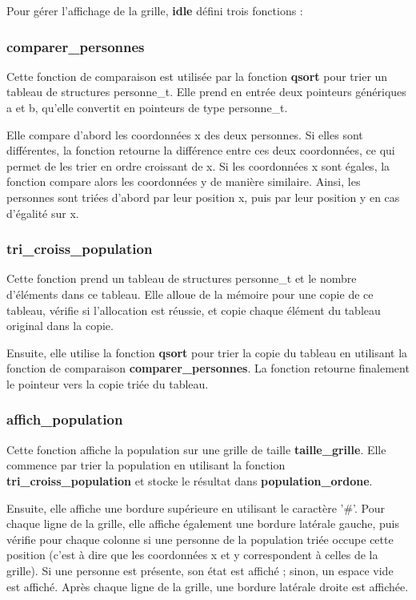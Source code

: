 \documentclass[12pt,french,titlepage]{article}
\begin{document}
Pour gérer l'affichage de la grille, \textbf{idle} défini trois fonctions :
\subsubsection*{comparer\_personnes}
Cette fonction de comparaison est utilisée par la fonction \textbf{qsort} pour trier un tableau de structures personne\_t. Elle prend en entrée deux pointeurs génériques a et b, qu'elle convertit en pointeurs de type personne\_t.

Elle compare d'abord les coordonnées x des deux personnes. Si elles sont différentes, la fonction retourne la différence entre ces deux coordonnées, ce qui permet de les trier en ordre croissant de x. Si les coordonnées x sont égales, la fonction compare alors les coordonnées y de manière similaire. Ainsi, les personnes sont triées d'abord par leur position x, puis par leur position y en cas d'égalité sur x.

\subsubsection*{tri\_croiss\_population}
Cette fonction prend un tableau de structures personne\_t et le nombre d'éléments dans ce tableau. Elle alloue de la mémoire pour une copie de ce tableau, vérifie si l'allocation est réussie, et copie chaque élément du tableau original dans la copie.

Ensuite, elle utilise la fonction \textbf{qsort} pour trier la copie du tableau en utilisant la fonction de comparaison \textbf{comparer\_personnes}. La fonction retourne finalement le pointeur vers la copie triée du tableau.

\subsubsection*{affich\_population}
Cette fonction affiche la population sur une grille de taille \textbf{taille\_grille}. Elle commence par trier la population en utilisant la fonction \textbf{tri\_croiss\_population} et stocke le résultat dans \textbf{population\_ordone}.

Ensuite, elle affiche une bordure supérieure en utilisant le caractère '\#'. Pour chaque ligne de la grille, elle affiche également une bordure latérale gauche, puis vérifie pour chaque colonne si une personne de la population triée occupe cette position (c'est à dire que les coordonnées x et y correspondent à celles de la grille). Si une personne est présente, son état est affiché ; sinon, un espace vide est affiché. Après chaque ligne de la grille, une bordure latérale droite est affichée.
\end{document}
